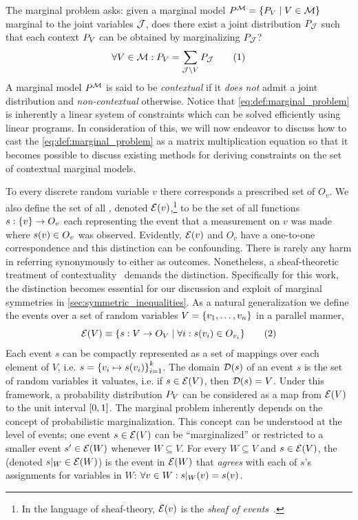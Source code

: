 \documentclass[aps, 10pt, english, twoside, pra, nofootinbib, tightenlines, longbibliography, superscriptaddress]{revtex4-1}
\begin{document}
    The marginal problem asks: given a marginal model $\prob^{\mscenario} = \bc{\prob[V] \mid V \in \mscenario}$ marginal to the joint variables $\mathcal{J}$, does there exist a joint distribution $\prob[\jointvar]$ such that each context $\prob[V]$ can be obtained by marginalizing $\prob[\jointvar]$?
    \[ \forall V \in \mscenario : \prob[V] = \sum_{\jointvar \setminus V} \prob[\jointvar] \eq \label{eq:def:marginal_problem}\]
    A marginal model $\prob^{\mscenario}$ is said to be \textit{contextual} if it \textit{does not} admit a joint distribution and \textit{non-contextual} otherwise. Notice that \cref{eq:def:marginal_problem} is inherently a linear system of constraints which can be solved efficiently using linear programs. In consideration of this, we will now endeavor to discuss how to cast the \cref{eq:def:marginal_problem} as a matrix multiplication equation so that it becomes possible to discuss existing methods for deriving constraints on the set of contextual marginal models.

    To every discrete random variable $v$ there corresponds a prescribed set of  $O_v$. We also define the set of all , denoted $\Events{v}$,\footnote{In the language of sheaf-theory, $\Events{v}$ is the \textit{sheaf of events}~\cite{Abramsky_2011}.} to be the set of all functions $s : \bc{v} \to O_v$ each representing the event that a measurement on $v$ was made where $s\br{v} \in O_v$ was observed. Evidently, $\Events{v}$ and $O_v$ have a one-to-one correspondence and this distinction can be confounding. There is rarely any harm in referring synonymously to either as outcomes. Nonetheless, a sheaf-theoretic treatment of contextuality~\cite{Abramsky_2011} demands the distinction.
    Specifically for this work, the distinction becomes essential for our discussion and exploit of marginal symmetries in \cref{sec:symmetric_inequalities}. As a natural generalization we define the events over a set of random variables $V = \bc{v_1, \ldots, v_n}$ in a parallel manner,
    \[ \Events{V} \defined \bc{s: V \to O_{V} \mid \forall i : s\br{v_i} \in O_{v_i} } \eq \label{eq:outcome_space}\]
    Each event $s$ can be compactly represented as a set of mappings over each element of $V$, i.e. $s = \bc{v_i\mapsto s\br{v_i}}_{i = 1}^{k}$. The domain $\Dom{s}$ of an event $s$ is the set of random variables it valuates, i.e. if $s \in \Events{V}$, then $\Dom{s} = V$. Under this framework, a probability distribution $\prob[V]$ can be considered as a map from $\Events{V}$ to the unit interval $\bs{0,1}$.
    The marginal problem inherently depends on the concept of probabilistic marginalization. This concept can be understood at the level of events; one event $s \in \Events{V}$ can be ``marginalized'' or restricted to a smaller event $s' \in \Events{W}$ whenever $W \subseteq V$. For every $W \subseteq V$ and $s \in \Events{V}$, the  (denoted $s|_{W} \in \Events{W}$) is the event in $\Events{W}$ that \textit{agrees} with each of $s$'s assignments for variables in $W$: $\forall v \in W : s|_{W}\br{v} = s\br{v}$.
\end{document}
